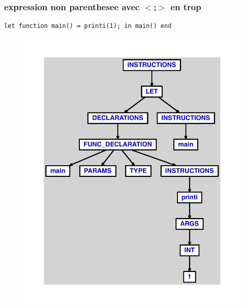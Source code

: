 \documentclass{article}
\begin{document}
\subsubsection{expression non parenthesee avec $ < $;$ > $ en trop}
\begin{lstlisting}
let function main() = printi(1); in main() end
\end{lstlisting}
\newpage
\begin{figure}[H]
\centering
\includegraphics[max width=\textwidth]{ast/ast_37.pdf}
\end{figure}
\newpage
\end{document}
